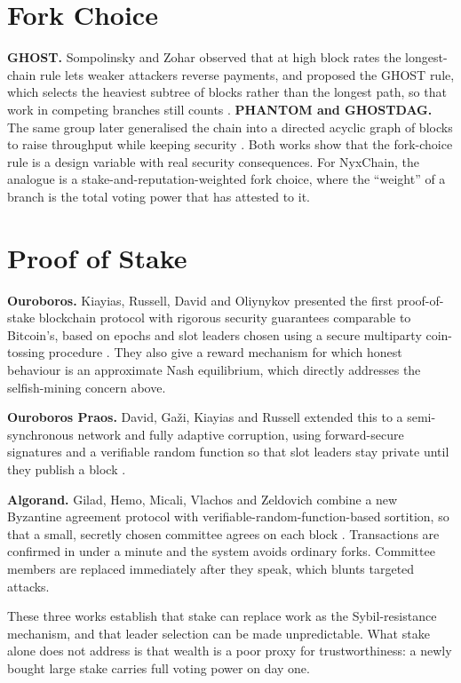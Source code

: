 \documentclass[11pt,a4paper]{article}
\begin{document}
\section{Fork Choice}\label{sec:forks}

\textbf{GHOST.} Sompolinsky and Zohar observed that at high block rates the longest-chain rule lets weaker attackers reverse payments, and proposed the GHOST rule, which selects the heaviest subtree of blocks rather than the longest path, so that work in competing branches still counts \cite{sompolinsky2015}. \textbf{PHANTOM and GHOSTDAG.} The same group later generalised the chain into a directed acyclic graph of blocks to raise throughput while keeping security \cite{sompolinsky2018}. Both works show that the fork-choice rule is a design variable with real security consequences. For NyxChain, the analogue is a stake-and-reputation-weighted fork choice, where the ``weight'' of a branch is the total voting power that has attested to it.

\section{Proof of Stake}\label{sec:pos}

\textbf{Ouroboros.} Kiayias, Russell, David and Oliynykov presented the first proof-of-stake blockchain protocol with rigorous security guarantees comparable to Bitcoin's, based on epochs and slot leaders chosen using a secure multiparty coin-tossing procedure \cite{kiayias2017}. They also give a reward mechanism for which honest behaviour is an approximate Nash equilibrium, which directly addresses the selfish-mining concern above.

\textbf{Ouroboros Praos.} David, Gaži, Kiayias and Russell extended this to a semi-synchronous network and fully adaptive corruption, using forward-secure signatures and a verifiable random function so that slot leaders stay private until they publish a block \cite{david2018}.

\textbf{Algorand.} Gilad, Hemo, Micali, Vlachos and Zeldovich combine a new Byzantine agreement protocol with verifiable-random-function-based sortition, so that a small, secretly chosen committee agrees on each block \cite{gilad2017}. Transactions are confirmed in under a minute and the system avoids ordinary forks. Committee members are replaced immediately after they speak, which blunts targeted attacks.

These three works establish that stake can replace work as the Sybil-resistance mechanism, and that leader selection can be made unpredictable. What stake alone does not address is that wealth is a poor proxy for trustworthiness: a newly bought large stake carries full voting power on day one.
\end{document}
